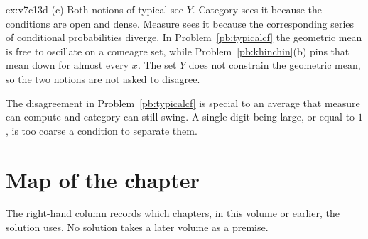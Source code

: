 \begin{solution}{ex:v7c13d}
(c) Both notions of typical see $Y$. Category sees it because the conditions are open and dense. Measure sees it because the corresponding series of conditional probabilities diverge. In Problem~\ref{pb:typicalcf} the geometric mean is free to oscillate on a comeagre set, while Problem~\ref{pb:khinchin}(b) pins that mean down for almost every $x$. The set $Y$ does not constrain the geometric mean, so the two notions are not asked to disagree.

\leads The disagreement in Problem~\ref{pb:typicalcf} is special to an average that measure can compute and category can still swing. A single digit being large, or equal to $1$, is too coarse a condition to separate them.
\end{solution}

\section*{Map of the chapter}

The right-hand column records which chapters, in this volume or earlier, the solution uses. No solution takes a later volume as a premise.

